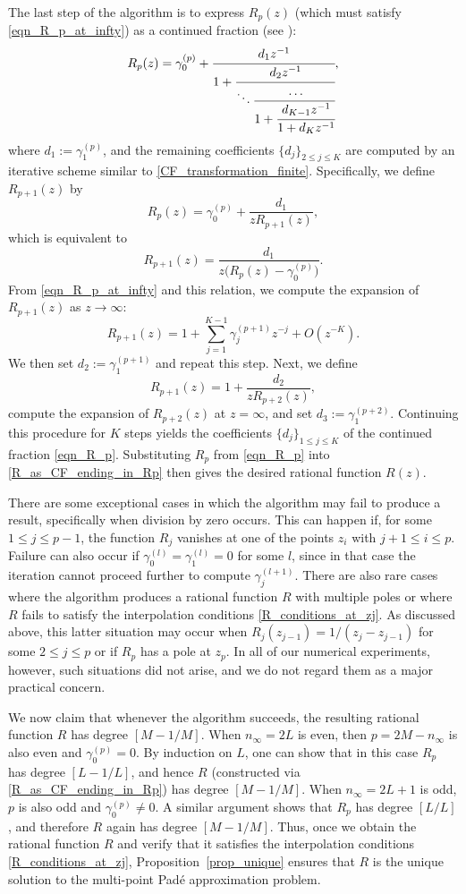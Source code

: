 \documentclass[12pt]{article}
\begin{document}
The last step of the algorithm is to express $R_p(z)$ (which must satisfy \eqref{eqn_R_p_at_infty}) as a continued fraction (see \cite[Section~4.2]{Baker1981}):  
\begin{equation}\label{eqn_R_p}
R_p(z)=\gamma_0^{(p)}+
\cfrac{d_1 z^{-1}}{1+\cfrac{d_2 z^{-1}}{\ddots 
\cfrac{\dots}{1+\cfrac{d_{K-1}z^{-1}}{1+d_{K} z^{-1}}}}}, 
\end{equation}
where $d_1:=\gamma_1^{(p)}$, and the remaining coefficients $\{d_j\}_{2\le j \le K}$ are computed by an iterative scheme similar to \eqref{CF_transformation_finite}. Specifically, we define $R_{p+1}(z)$ by 
\[
R_p(z)=\gamma_0^{(p)}+\frac{d_1}{z R_{p+1}(z)},  
\]
which is equivalent to 
\[
R_{p+1}(z) = \frac{d_1}{z \big(R_p(z)-\gamma_0^{(p)}\big)}.
\]
From \eqref{eqn_R_p_at_infty} and this relation, we compute the expansion of $R_{p+1}(z)$ as $z \to \infty$: 
\begin{equation*}
R_{p+1}(z)=1+\sum_{j=1}^{K-1} \gamma^{(p+1)}_j z^{-j} + O(z^{-K}).
\end{equation*}
We then set $d_2:=\gamma_1^{(p+1)}$ and repeat this step. Next, we define 
\[
R_{p+1}(z)=1+\frac{d_2}{z R_{p+2}(z)},
\]
compute the expansion of $R_{p+2}(z)$ at $z=\infty$, and set $d_3:=\gamma_1^{(p+2)}$. Continuing this procedure for $K$ steps yields the coefficients $\{d_j\}_{1\le j \le K}$ of the continued fraction \eqref{eqn_R_p}. Substituting $R_p$ from \eqref{eqn_R_p} into \eqref{R_as_CF_ending_in_Rp} then gives the desired rational function $R(z)$.  

There are some exceptional cases in which the algorithm may fail to produce a result, specifically when division by zero occurs. This can happen if, for some $1\le j \le p-1$, the function $R_j$ vanishes at one of the points $z_i$ with $j+1 \le i \le p$. Failure can also occur if $\gamma_0^{(l)}=\gamma_1^{(l)}=0$ for some $l$, since in that case the iteration cannot proceed further to compute $\gamma_j^{(l+1)}$. There are also rare cases where the algorithm produces a rational function $R$ with multiple poles or where $R$ fails to satisfy the interpolation conditions \eqref{R_conditions_at_zj}. As discussed above, this latter situation may occur when $R_j(z_{j-1}) =1/(z_j-z_{j-1})$ for some $2\le j \le p$ or if $R_p$ has a pole at $z_p$. In all of our numerical experiments, however, such situations did not arise, and we do not regard them as a major practical concern.  

We now claim that whenever the algorithm succeeds, the resulting rational function $R$ has degree $[M-1/M]$. When $n_{\infty}=2L$ is even, then $p=2M-n_{\infty}$ is also even and $\gamma_0^{(p)}=0$. By induction on $L$, one can show that in this case $R_p$ has degree $[L-1/L]$, and hence $R$ (constructed via \eqref{R_as_CF_ending_in_Rp}) has degree $[M-1/M]$. When $n_{\infty}=2L+1$ is odd, $p$ is also odd and $\gamma_0^{(p)}\neq 0$. A similar argument shows that $R_p$ has degree $[L/L]$, and therefore $R$ again has degree $[M-1/M]$. Thus, once we obtain the rational function $R$ and verify that it satisfies the interpolation conditions \eqref{R_conditions_at_zj}, Proposition~\ref{prop_unique} ensures that $R$ is the unique solution to the multi-point Pad\'e approximation problem.  
 
\end{document}
